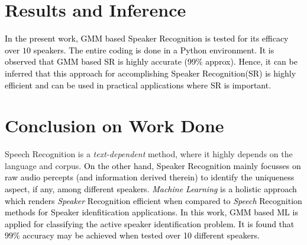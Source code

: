 \documentclass{article}
\begin{document}
\section{\textbf{{Results and Inference}}} \label{result}
\textcolor{black}{In the present work, 
GMM based Speaker Recognition is tested for its efficacy over $10$ speakers. The entire coding is done in a Python environment. It is observed that GMM based SR is highly accurate (99$\%$ approx).%
Hence, it can be inferred that this approach for accomplishing Speaker Recognition(SR) is highly efficient and can be used in practical applications where SR is important.}

\section{\textbf{{Conclusion on Work Done}}}
Speech Recognition is a \textit{text-dependent} method, where it highly depends on the language and corpus. \textcolor{black}{On the other hand, Speaker Recognition mainly focusses on raw audio percepts (and information derived therein) %
to identify the uniqueness aspect, if any, among different speakers. \textit{Machine Learning} is a holistic approach which renders \textit{Speaker} Recognition efficient when compared to \textit{Speech} Recognition methods for Speaker idenfitication applications. %
In this work, GMM based ML is applied for classifying the active speaker identification problem. It is found that $99\%$ accuracy may be achieved when tested over 10 different speakers. }
\end{document}
